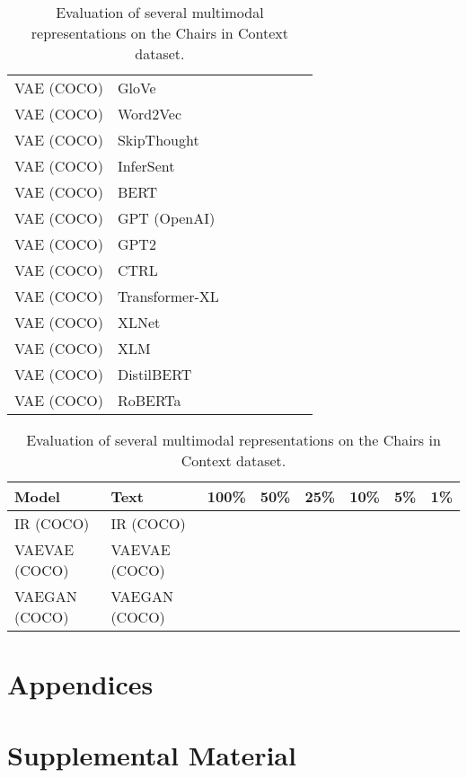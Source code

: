 \documentclass[11pt,a4paper]{article}
\begin{document}
\begin{table*}[t!]
\begin{tabular}{llcccccc}
VAE (COCO) & GloVe & & & & & & \\
VAE (COCO) & Word2Vec & & & & & & \\
VAE (COCO) & SkipThought & & & & & & \\
VAE (COCO) & InferSent & & & & & & \\
VAE (COCO) & BERT & & & & & & \\
VAE (COCO) & GPT (OpenAI) & & & & & & \\
VAE (COCO) & GPT2 & & & & & & \\
VAE (COCO) & CTRL & & & & & & \\
VAE (COCO) & Transformer-XL & & & & & & \\
VAE (COCO) & XLNet & & & & & & \\
VAE (COCO) & XLM & & & & & & \\
VAE (COCO) & DistilBERT & & & & & & \\
VAE (COCO) & RoBERTa & & & & & & \\
\hline
\end{tabular}
\caption{\label{table:colors} Evaluation of several multimodal representations on the Chairs in Context dataset.}
\end{table*}

\begin{table*}[t!]
\centering
\begin{tabular}{llcccccc}
\hline
\textbf{Model} & \textbf{Text} & \textbf{100\%} & \textbf{50\%} & \textbf{25\%} & \textbf{10\%} & \textbf{5\%} & \textbf{1\%} \\
\hline
IR (COCO) & IR (COCO) & & & & & & \\
VAEVAE (COCO) & VAEVAE (COCO) & & & & & & \\
VAEGAN (COCO) & VAEGAN (COCO) & & & & & & \\
\hline
\end{tabular}
\caption{\label{table:colors} Evaluation of several multimodal representations on the Chairs in Context dataset.}
\end{table*}

\appendix

\section{Appendices}
\label{sec:appendix}

\section{Supplemental Material}
\label{sec:supplemental}
\end{document}
